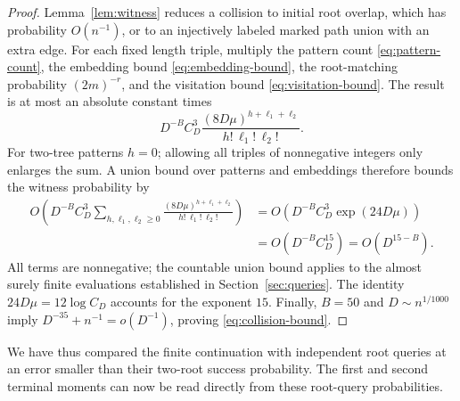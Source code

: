 \begin{proof}
Lemma~\ref{lem:witness} reduces a collision to initial root overlap,
which has probability $O(n^{-1})$, or to an injectively labeled marked
path union with an extra edge. For each fixed length triple, multiply
the pattern count \eqref{eq:pattern-count}, the embedding bound
\eqref{eq:embedding-bound}, the root-matching probability $(2m)^{-r}$,
and the visitation bound \eqref{eq:visitation-bound}. The result is at
most an absolute constant times
\[
 D^{-B}C_D^3
 \frac{(8D\mu)^{h+\ell_1+\ell_2}}{h!\,\ell_1!\,\ell_2!}.
\]
For two-tree patterns $h=0$; allowing all triples of nonnegative
integers only enlarges the sum. A union bound over patterns and
embeddings therefore bounds the witness probability by
\begin{align*}
 O\left(D^{-B}C_D^3
   \sum_{h,\ell_1,\ell_2\geq0}
   \frac{(8D\mu)^{h+\ell_1+\ell_2}}{h!\,\ell_1!\,\ell_2!}\right)
 &=O\left(D^{-B}C_D^3\exp(24D\mu)\right)\\
 &=O\left(D^{-B}C_D^{15}\right)
  =O(D^{15-B}).
\end{align*}
All terms are nonnegative; the countable union bound applies to the
almost surely finite evaluations established in
Section~\ref{sec:queries}. The identity
$24D\mu=12\log C_D$ accounts for the exponent $15$.
Finally, $B=50$ and $D\sim n^{1/1000}$ imply
$D^{-35}+n^{-1}=o(D^{-1})$, proving \eqref{eq:collision-bound}.
\end{proof}

We have thus compared the finite continuation with independent root
queries at an error smaller than their two-root success probability.
The first and second terminal moments can now be read directly from
these root-query probabilities.

